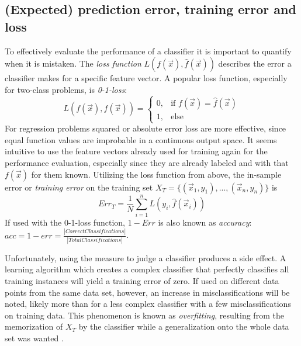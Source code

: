 \subsection{(Expected) prediction error, training error and loss}
To effectively evaluate the performance of a classifier it is important to quantify when it is mistaken. The \textit{loss function} $L(f(\vec{x}), \hat{f}(\vec{x}))$ describes the error a classifier makes for a specific feature vector. A popular loss function, especially for two-class problems, is \textit{0-1-loss}:
\begin{equation}
L(f(\vec{x}), \hat{f}(\vec{x})) =
\begin{cases}
	0, & \text{if }f(\vec{x}) = \hat{f}(\vec{x}) \\
	1, & \text{else}
\end{cases}
\end{equation}
For regression problems squared or absolute error loss are more effective, since equal function values are improbable in a continuous output space. It seems intuitive to use the feature vectors already used for training again for the performance evaluation, especially since they are already labeled and with that $f(\vec{x})$ for them known. Utilizing the loss function from above, the in-sample error or \textit{training error} \cite{HastieEtAl2009} on the training set $X_T = \{(\vec{x}_1, y_1), ..., (\vec{x}_n, y_n)\}$ is
\begin{equation}
Err_{T} = \frac{1}{N}\sum_{i=1}^{n} L(y_i, \hat{f}(\vec{x}_i))
\end{equation}
If used with the 0-1-loss function, $1 - Err$ is also known as \textit{accuracy}: $acc = 1 - err = \frac{|Correct Classifications|}{|Total Classifications|}$.

Unfortunately, using the measure to judge a classifier produces a side effect. A learning algorithm which creates a complex classifier that perfectly classifies all training instances will yield a training error of zero. If used on different data points from the same data set, however, an increase in misclassifications will be noted, likely more than for a less complex classifier with a few misclassifications on training data. This phenomenon is known as \textit{overfitting}, resulting from the memorization of $X_T$ by the classifier while a generalization onto the whole data set was wanted \cite{Dietterich1995}.

